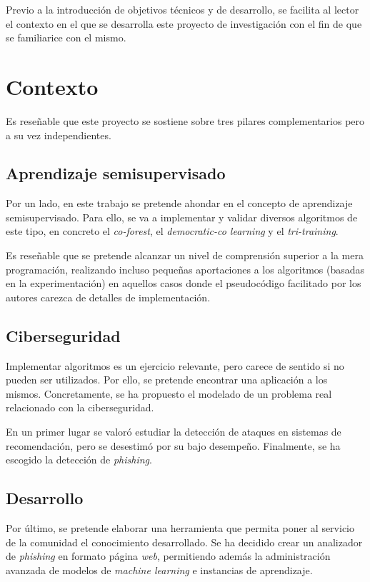 
Previo a la introducción de objetivos técnicos y de desarrollo, se facilita al lector el contexto en el que se desarrolla este proyecto de investigación con el fin de que se familiarice con el mismo.

\section{Contexto}
\label{contexto}

Es reseñable que este proyecto se sostiene sobre tres pilares complementarios pero a su vez independientes.

\subsection{Aprendizaje semisupervisado}

Por un lado, en este trabajo se pretende ahondar en el concepto de aprendizaje semisupervisado. Para ello, se va a implementar y validar diversos algoritmos de este tipo, en concreto el \textit{co-forest}, el \textit{democratic-co learning} y el \textit{tri-training}.

Es reseñable que se pretende alcanzar un nivel de comprensión superior a la mera programación, realizando incluso pequeñas aportaciones a los algoritmos (basadas en la experimentación) en aquellos casos donde el pseudocódigo facilitado por los autores carezca de detalles de implementación.

\subsection{Ciberseguridad}

Implementar algoritmos es un ejercicio relevante, pero carece de sentido si no pueden ser utilizados. Por ello, se pretende encontrar una aplicación a los mismos. Concretamente, se ha propuesto el modelado de un problema real relacionado con la ciberseguridad.

En un primer lugar se valoró estudiar la detección de ataques en sistemas de recomendación, pero se desestimó por su bajo desempeño. Finalmente, se ha escogido la detección de \textit{phishing}.


\subsection{Desarrollo}

Por último, se pretende elaborar una herramienta que permita poner al servicio de la comunidad el conocimiento desarrollado. Se ha decidido crear un analizador de \textit{phishing} en formato página \textit{web}, permitiendo además la administración avanzada de modelos de \textit{machine learning} e instancias de aprendizaje.

